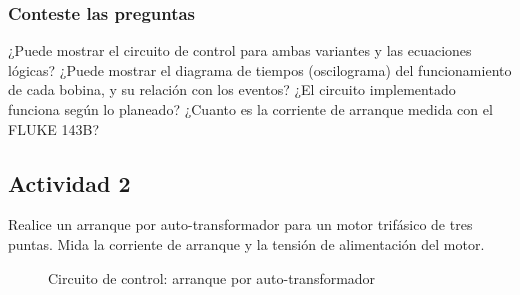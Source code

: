  
\subsubsection{Conteste las preguntas}

¿Puede mostrar el circuito de control para ambas variantes y las ecuaciones lógicas?
¿Puede mostrar el diagrama de tiempos (oscilograma) del funcionamiento de cada bobina, y su relación con los eventos?
¿El circuito implementado funciona según lo planeado? ¿Cuanto es la corriente de arranque medida con el FLUKE 143B?

\subsection{Actividad 2}
 
 Realice un arranque por auto-transformador para un motor trifásico de tres puntas. Mida la corriente de arranque  y la tensión de alimentación del motor.

\begin{figure}[H]
\centering
    \caption{Circuito de control: arranque por auto-transformador}
    \label{fig:control-auto-transformador}
\end{figure}

